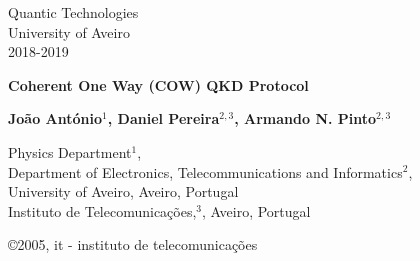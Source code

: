 \documentclass[5pt]{article}
\newcommand{\br}[1]{{\textbf{\color{itred} #1}}}%
\begin{document}
\begin{titlepage}  

\color{itblue} \sffamily \noindent \small
\hspace*{1cm}  Quantic Technologies\\
\hspace*{1cm}  University of Aveiro\\ %
%
\hspace*{1cm}  2018-2019\\ 

\vspace*{1cm}
\begin{center}
    \color{black} \sffamily \noindent \Large
    \br{Coherent One Way (COW) QKD Protocol \\}
\end{center}
\vspace{6mm}
\begin{center}
    \color{black}
    \textbf{João António$^1$, Daniel Pereira$^{2,3}$, Armando N. Pinto$^{2,3}$\\}
    {}
\end{center}

\vspace{0.0mm}
\scriptsize
\begin{center}
Physics Department$^1$,\\
Department of Electronics, Telecommunications and Informatics$^2$,\\
University of Aveiro, Aveiro, Portugal\\
Instituto de Telecomunica\c{c}\~{o}es,$^3$, Aveiro, Portugal\\
\end{center}

\vspace{1.0cm}
\hspace*{13.2cm}\tiny \copyright 2005, it - instituto de telecomunica\c{c}\~{o}es\hfill

\end{titlepage}


\renewcommand{\headsep}{-25pt}

\end{document}
